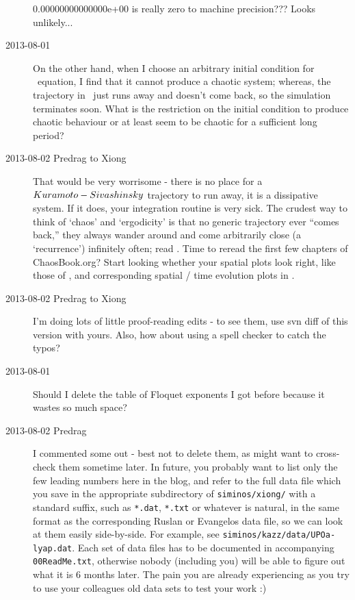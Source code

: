 \begin{description}
0.00000000000000e+00 is really zero to machine precision??? Looks unlikely...

\item[2013-08-01 \XD]
On the other hand, when I choose an arbitrary initial
condition for \KS\ equation, I find that it cannot produce a chaotic system; whereas, the
trajectory in \statesp\ just runs away and doesn't come back, so the simulation terminates
soon. What is the restriction on the initial condition to produce chaotic behaviour or at least
seem to be chaotic for a sufficient long period?

\item[2013-08-02 Predrag to Xiong]
That would be very worrisome - there is no place for a $Ku\-ra\-mo\-to-Siva\-shin\-sky$ trajectory
to run away, it is a dissipative system. If it does, your integration
routine is very sick. The crudest way to think of
`chaos' and `ergodicity' is that no generic trajectory ever ``comes
back,'' they always wander around and come arbitrarily close (a
`recurrence') infinitely often; read .
 Time to reread the first few chapters of
ChaosBook.org? Start looking whether your spatial plots look right, like
those of , and corresponding spatial / time evolution
plots in .




\item[2013-08-02 Predrag to Xiong] I'm doing lots of little proof-reading
edits - to see them, use svn diff of this version with yours. Also, how
about using a spell checker to catch the typos?

\item[2013-08-01 \XD] Should I delete the table of Floquet
exponents I got before because it wastes so much space?

\item[2013-08-02 Predrag] I commented some out - best not to delete
them, as might want to cross-check them sometime later.
In future, you probably want to list only the
few leading numbers here in the blog, and refer to the full data file
which you save in the appropriate subdirectory of \texttt{siminos/xiong/}
with a standard suffix, such as \texttt{*.dat}, \texttt{*.txt} or
whatever is natural, in the same format as the corresponding Ruslan or
Evangelos data file, so we can look at them easily side-by-side. For
example, see \texttt{siminos/kazz/data/UPOa-lyap.dat}. Each set of data
files has to be documented in accompanying \texttt{00ReadMe.txt},
otherwise nobody (including you) will be able to figure out what it is 6
months later. The pain you are already experiencing as you try to use
your colleagues old data sets to test your work :)


\end{description}
